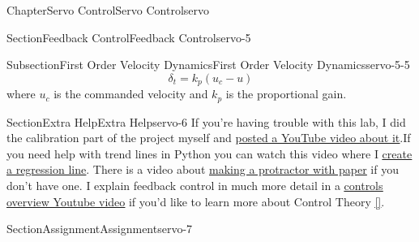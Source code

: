 \documentclass[oneside,10pt,]{book}
\newcommand{\xreffont}{\relax}
\newcommand{\linkhilite}[1]{\underline{#1}}
\numberwithin{equation}{section}
\begin{document}
\begin{chapterptx}{Chapter}{Servo Control}{}{Servo Control}{}{}{servo}
\begin{sectionptx}{Section}{Feedback Control}{}{Feedback Control}{}{}{servo-5}
\begin{subsectionptx}{Subsection}{First Order Velocity Dynamics}{}{First Order Velocity Dynamics}{}{}{servo-5-5}
\begin{equation}
\delta_t = k_p(u_c-u)\label{servo-5-5-2-9}
\end{equation}
where \(u_c\) is the commanded velocity and \(k_p\) is the proportional gain.%
\end{subsectionptx}
\end{sectionptx}
%
%
\typeout{************************************************}
\typeout{************************************************}
%
\begin{sectionptx}{Section}{Extra Help}{}{Extra Help}{}{}{servo-6}
If you're having trouble with this lab, I did the calibration part of the project myself and \href{https://youtu.be/ynlGiPZk5VM}{\linkhilite{posted a YouTube video about it}}.If you need help with trend lines in Python you can watch this video where I  \href{https://www.youtube.com/watch?v=4vYYPHRMdqM\&feature=youtu.be}{\linkhilite{create a regression line}}. There is a video about \href{https://www.youtube.com/watch?v=XSLzcwTOsWk}{\linkhilite{making a protractor with paper}} if you don't have one.  I explain feedback control in much more detail in a \href{https://www.youtube.com/watch?v=PAK5V8wzVXY\&list=PL_D7_GvGz-v30U58EUUOdJGgO4u75DXoB\&index=1}{\linkhilite{controls overview Youtube video}} if you'd like to learn more about Control Theory \hyperlink{youtube}{\linkhilite{[{\xreffont 50}]}}.%
\end{sectionptx}
%
%
\typeout{************************************************}
\typeout{************************************************}
%
\begin{sectionptx}{Section}{Assignment}{}{Assignment}{}{}{servo-7}
\begin{introduction}{}%

\end{introduction}
\end{sectionptx}
\end{chapterptx}
\end{document}
